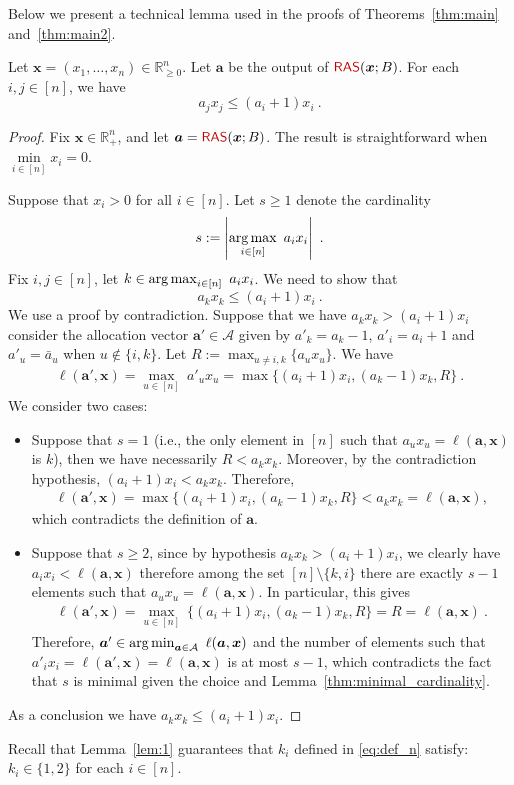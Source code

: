 Below we present a technical lemma used in the proofs of Theorems~\ref{thm:main} and~\ref{thm:main2}.
\begin{lemma}
	\label{lem:1}
	Let $\bm{x}=(x_1, \dots, x_n) \in \mathbb{R}_{\ge 0}^n$. Let $\bm{a}$ be the output of $\algname{RAS}(\bm{x}; B)$. For each $i, j \in [n]$, we have
	$$ 
	a_{ j} x_j \le \left(a_{ i}+1 \right) x_i~.
	$$
\end{lemma}
%
\begin{proof}
	Fix $\bm{x} \in \mathbb{R}_+^n$, and let $\bm{a} = \algname{RAS}(\bm{x};B)$. The result is straightforward when $\min\limits_{i\in [n]}{x_i} = 0$.
	
	\noindent Suppose that $x_i >0$ for all $i \in [n]$.
	Let $s\ge 1$ denote the cardinality
	$$
	s:= \left| \operatorname*{arg\,max}_{i \in [n]} \  a_{i} x_i  \right|~.
	$$
	Fix $i,j \in [n]$, let $k \in \operatorname*{arg\,max}_{i \in [n]} \  a_{i} x_i $. We need to show that
	$$
	a_{k} x_k \le (a_{i}+1)x_i~.
	$$
	We use a proof by contradiction.
	Suppose that we have $ a_{k} x_k > (a_{i}+1)x_i$ consider the allocation vector $\bm{a}'\in \mathcal{A}$ given by $a'_k = a_{k}-1$, $a'_i = a_i+1$ and $a'_u = \bar{a}_u$ when $u \notin \{i,k\}$. Let $R := \max_{u \neq i,k} \{a_u x_u \}$. We have
	\begin{align*}
		\ell(\bm{a}',\bm{x})
		= \max_{u \in [n]} \ a'_u x_u
		= \max \{(a_i+1) x_i, (a_k-1) x_k, R \}~.
	\end{align*}
	We consider two cases:
	\begin{itemize}
		\item Suppose that $s=1$ (i.e., the only element in $[n]$ such that $a_ux_u=\ell(\bm{a}, \bm{x})$ is $k$), then we have necessarily $R< a_k x_k $. Moreover, by the contradiction hypothesis, $(a_i+1)x_i < a_k x_k$.
		Therefore,
		\begin{align*}
			\ell(\bm{a}', \bm{x}) = \max\{ (a_i+1)x_i, (a_k-1)x_k, R\}
			< 	a_k x_k = \ell(\bm{a}, \bm{x}),
		\end{align*}
		which contradicts the definition of $\bm{a}$.
		\item Suppose that $s\ge 2$, since by hypothesis $ a_k x_k > (a_i+1)x_i$, we clearly have $a_ix_i < \ell(\bm{a}, \bm{x})$ therefore among the set $[n]\setminus \{k,i\}$ there are exactly $s-1$ elements such that $a_u x_u = \ell(\bm{a}, \bm{x})$. In particular, this gives
		\begin{align*}
			\ell(\bm{a}',\bm{x})
			= \max_{u \in [n]} \ \{(a_i+1) x_i, (a_k-1) x_k, R \}
			= R = \ell(\bm{a}, \bm{x})~.
		\end{align*}
		Therefore, $\bm{a}' \in \argmin_{\bm{a} \in \mathcal{A}} \ \ell(\bm{a}, \bm{x})$ and the number of elements such that $a'_i x_i = \ell(\bm{a}', \bm{x})=\ell(\bm{a}, \bm{x})$ is at most $s-1$, which contradicts the fact that $s$ is minimal given the  choice and Lemma~\ref{thm:minimal_cardinality}.
	\end{itemize}
	As a conclusion we have $a_k x_k\le (a_i+1)x_i$.
\end{proof}
\begin{remark}
	Recall that Lemma~\ref{lem:1} guarantees that $k_i$ defined in \eqref{eq:def_n} satisfy: $k_i \in \{1, 2\}$ for each $i \in [n]$.
\end{remark}


